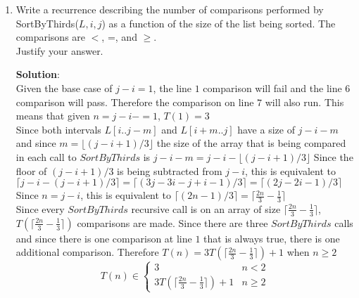 \documentclass[11pt]{article}
\begin{document}
\begin{enumerate}
\item
\label{recurrence}
\begin{question}
Write a recurrence describing the number of comparisons performed by SortByThirds($L,i,j$)
as a function of the size of the list being sorted. The comparisons are $<$, =, and $\geq$. \\
Justify your answer.
\end{question}

\begin{solution}
{\bf Solution}:\\
Given the base case of $j-i = 1$, the line $1$ comparison will fail and the line $6$ comparison will pass. Therefore the comparison on line $7$ will also run.
This means that given $n=j-i-=1$, $T(1) = 3$\\
Since both intervals $L[i..j-m]$ and $L[i+m..j]$ have a size of $j-i -m$ and since $m = \lfloor(j-i+1)/3\rfloor$ the size of the array that is being compared in each call to $SortByThirds$ is $j - i - m = j-i -\lfloor(j-i+1)/3\rfloor$ Since the floor of $(j-i+1)/3$ is being subtracted from $j-i$, this is equivalent to $\lceil j - i - (j-i+1)/3 \rceil = \lceil (3j-3i-j+i - 1)/3\rceil = \lceil (2j-2i - 1)/3 \rceil$\\
Since $n = j - i$, this is equivalent to $\lceil (2n-1)/3\rceil =  \lceil \frac{2n}3- \frac13\rceil$\\
Since every $SortByThirds$ recursive call is on an array of size $\lceil \frac{2n}3- \frac13\rceil$, $T(\lceil \frac{2n}3- \frac13\rceil)$ comparisons are made. Since there are three $SortByThirds$ calls and since there is one comparison at line $1$ that is always true, there is one additional comparison. Therefore $T(n) = 3T(\lceil \frac{2n}3 - \frac 13\rceil) + 1$ when $n\ge2$\\
$$T(n) \in \left\{
\begin{array}{ll}
3 & n < 2\\
3T(\lceil \frac{2n}3 - \frac13 \rceil)+ 1&  n\ge2
\end{array} \right .$$

\end{solution}


\end{enumerate}
\end{document}

